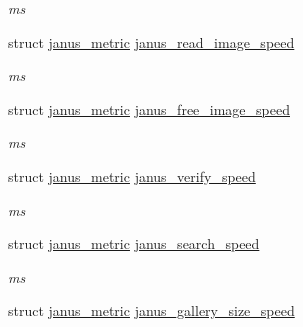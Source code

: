 \begin{DoxyCompactItemize}
\begin{DoxyCompactList}\small\item\em ms \end{DoxyCompactList}\item 
\hypertarget{structjanus__metrics_a04c4c8a3937594049589e3577b8c31e2}{}struct \hyperlink{structjanus__metric}{janus\+\_\+metric} \hyperlink{structjanus__metrics_a04c4c8a3937594049589e3577b8c31e2}{janus\+\_\+read\+\_\+image\+\_\+speed}\label{structjanus__metrics_a04c4c8a3937594049589e3577b8c31e2}

\begin{DoxyCompactList}\small\item\em ms \end{DoxyCompactList}\item 
\hypertarget{structjanus__metrics_ae439a18ea9a9c73798aa3353c0b70bc2}{}struct \hyperlink{structjanus__metric}{janus\+\_\+metric} \hyperlink{structjanus__metrics_ae439a18ea9a9c73798aa3353c0b70bc2}{janus\+\_\+free\+\_\+image\+\_\+speed}\label{structjanus__metrics_ae439a18ea9a9c73798aa3353c0b70bc2}

\begin{DoxyCompactList}\small\item\em ms \end{DoxyCompactList}\item 
\hypertarget{structjanus__metrics_a95dad26af2689c65089391b1ebecd822}{}struct \hyperlink{structjanus__metric}{janus\+\_\+metric} \hyperlink{structjanus__metrics_a95dad26af2689c65089391b1ebecd822}{janus\+\_\+verify\+\_\+speed}\label{structjanus__metrics_a95dad26af2689c65089391b1ebecd822}

\begin{DoxyCompactList}\small\item\em ms \end{DoxyCompactList}\item 
\hypertarget{structjanus__metrics_abda47267e658afbf6add56da6030ac70}{}struct \hyperlink{structjanus__metric}{janus\+\_\+metric} \hyperlink{structjanus__metrics_abda47267e658afbf6add56da6030ac70}{janus\+\_\+search\+\_\+speed}\label{structjanus__metrics_abda47267e658afbf6add56da6030ac70}

\begin{DoxyCompactList}\small\item\em ms \end{DoxyCompactList}\item 
\hypertarget{structjanus__metrics_a1ea9ea82a6bfd9dc0e41f4ca9401f5e0}{}struct \hyperlink{structjanus__metric}{janus\+\_\+metric} \hyperlink{structjanus__metrics_a1ea9ea82a6bfd9dc0e41f4ca9401f5e0}{janus\+\_\+gallery\+\_\+size\+\_\+speed}\label{structjanus__metrics_a1ea9ea82a6bfd9dc0e41f4ca9401f5e0}


\end{DoxyCompactItemize}

